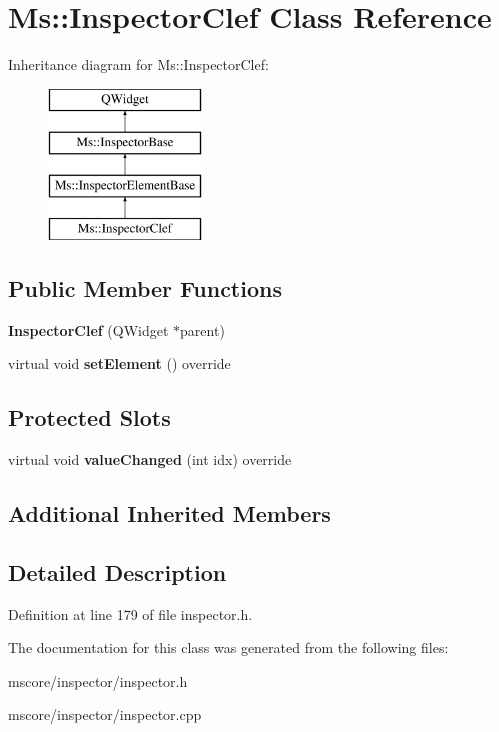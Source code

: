 \hypertarget{class_ms_1_1_inspector_clef}{}\section{Ms\+:\+:Inspector\+Clef Class Reference}
\label{class_ms_1_1_inspector_clef}
Inheritance diagram for Ms\+:\+:Inspector\+Clef\+:\begin{figure}[H]
\begin{center}
\leavevmode
\includegraphics[height=4.000000cm]{class_ms_1_1_inspector_clef}
\end{center}
\end{figure}
\subsection*{Public Member Functions}
\begin{DoxyCompactItemize}
\item 
\mbox{\label{class_ms_1_1_inspector_clef_a4b41f7ad1038d8a5ac6ec399b6b68ba7}} 
{\bfseries Inspector\+Clef} (Q\+Widget $\ast$parent)
\item 
\mbox{\label{class_ms_1_1_inspector_clef_a649b51ab570cfd7d82561841ea575632}} 
virtual void {\bfseries set\+Element} () override
\end{DoxyCompactItemize}
\subsection*{Protected Slots}
\begin{DoxyCompactItemize}
\item 
\mbox{\label{class_ms_1_1_inspector_clef_adcdb107795b22c4526e0fdd0b21152fa}} 
virtual void {\bfseries value\+Changed} (int idx) override
\end{DoxyCompactItemize}
\subsection*{Additional Inherited Members}


\subsection{Detailed Description}


Definition at line 179 of file inspector.\+h.



The documentation for this class was generated from the following files\+:\begin{DoxyCompactItemize}
\item 
mscore/inspector/inspector.\+h\item 
mscore/inspector/inspector.\+cpp\end{DoxyCompactItemize}
